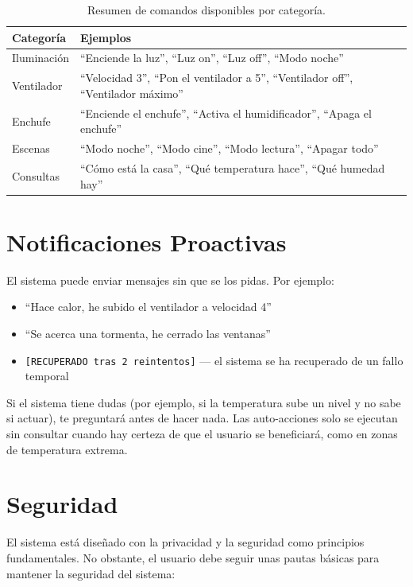 \begin{table}[ht]
\centering
\small
\begin{tabular}{|l|l|}
\hline
\textbf{Categoría} & \textbf{Ejemplos} \\
\hline
Iluminación & ``Enciende la luz'', ``Luz on'', ``Luz off'', ``Modo noche'' \\
Ventilador & ``Velocidad 3'', ``Pon el ventilador a 5'', ``Ventilador off'', ``Ventilador máximo'' \\
Enchufe & ``Enciende el enchufe'', ``Activa el humidificador'', ``Apaga el enchufe'' \\
Escenas & ``Modo noche'', ``Modo cine'', ``Modo lectura'', ``Apagar todo'' \\
Consultas & ``Cómo está la casa'', ``Qué temperatura hace'', ``Qué humedad hay'' \\
\hline
\end{tabular}
\caption{Resumen de comandos disponibles por categoría.}
\label{tab:comandos_resumen}
\end{table}

\section{Notificaciones Proactivas}

El sistema puede enviar mensajes sin que se los pidas. Por ejemplo:

\begin{itemize}
    \item ``Hace calor, he subido el ventilador a velocidad 4''
    \item ``Se acerca una tormenta, he cerrado las ventanas''
    \item \texttt{[RECUPERADO tras 2 reintentos]} --- el sistema se ha recuperado de un fallo temporal
\end{itemize}

Si el sistema tiene dudas (por ejemplo, si la temperatura sube un nivel y no sabe si actuar), te preguntará antes de hacer nada. Las auto-acciones solo se ejecutan sin consultar cuando hay certeza de que el usuario se beneficiará, como en zonas de temperatura extrema.

\section{Seguridad}

El sistema está diseñado con la privacidad y la seguridad como principios fundamentales. No obstante, el usuario debe seguir unas pautas básicas para mantener la seguridad del sistema:

